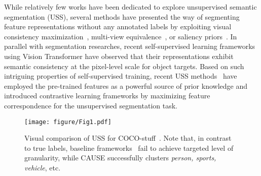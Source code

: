 \documentclass{article} \usepackage{iclr2024_conference,times}
\begin{document}
While relatively few works have been dedicated to explore unsupervised semantic segmentation (USS), several methods have presented the way of segmenting feature representations without any annotated labels by exploiting visual consistency maximization~\citep{ji2019invariant, hwang2019segsort}, multi-view equivalence~\citep{cho2021picie}, or saliency priors~\citep{van2021unsupervised, ke2022unsupervised}. In parallel with segmentation researches, recent self-supervised learning frameworks~\citep{caron2021emerging, bao2022beit} using Vision Transformer have observed that their representations exhibit semantic consistency at the pixel-level scale for object targets. Based on such intriguing properties of self-supervised training, recent USS methods~\citep{hamilton2022unsupervised, ziegler2022self, yin2022transfgu, zadaianchuk2023unsupervised, liacseg, seong2023leveraging} have employed the pre-trained features as a powerful source of prior knowledge and introduced contrastive learning frameworks by maximizing feature correspondence for the unsupervised segmentation task.

\begin{figure}[t]
\vspace{-13mm}
\centering
\texttt{[image: figure/Fig1.pdf]}
\vspace*{-2.5mm}
\caption{Visual comparison of USS for COCO-stuff~\citep{caesar2018coco}. Note that, in contrast to true labels, baseline frameworks~\citep{hamilton2022unsupervised, seong2023leveraging, shin2022reco} fail to achieve targeted level of granularity, while CAUSE successfully clusters \textit{person, sports, vehicle}, etc.}
\label{fig:1}
\vspace{-5mm}
\end{figure}
\end{document}
